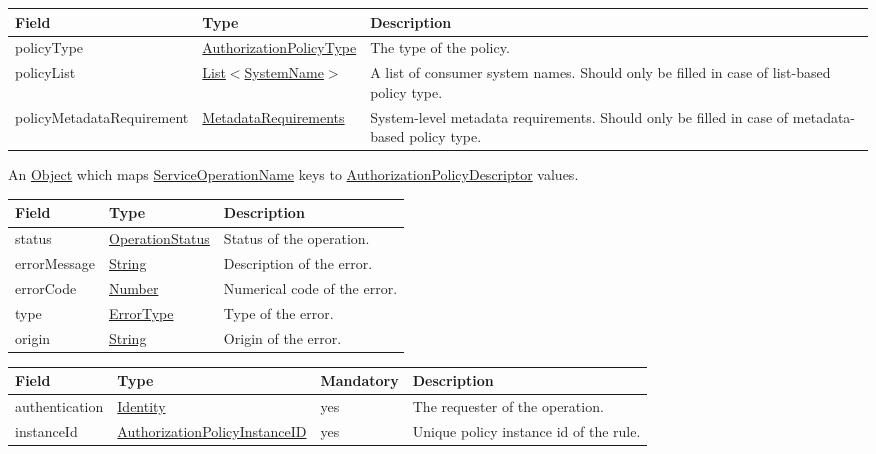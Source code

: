 \documentclass[a4paper]{arrowhead}
\newcommand{\pref}[1]{{\textcolor{ArrowheadGrey}{\hyperref[sec:model:primitives:#1]{#1}}}}
\begin{document}

\begin{table}[ht!]
\begin{tabularx}{\textwidth}{| p{4.3cm} | p{4.1cm} | X |} \hline
\rowcolor{gray!33} Field & Type      & Description \\ \hline
policyType & \pref{AuthorizationPolicyType} & The type of the policy. \\ \hline
policyList & \pref{List}$<$\pref{SystemName}$>$ & A list of consumer system names. Should only be filled in case of list-based policy type. \\ \hline
policyMetadataRequirement & \hyperref[sec:model:MetadataRequirements]{MetadataRequirements} & System-level metadata requirements. Should only be filled in case of metadata-based policy type. \\ \hline 
\end{tabularx}
\end{table}


An \pref{Object} which maps \pref{ServiceOperationName} keys to \hyperref[sec:model:AuthorizationPolicyDescriptor]{AuthorizationPolicyDescriptor} values.


\begin{table}[ht!]
\begin{tabularx}{\textwidth}{| p{4.25cm} | p{3.5cm} | X |} \hline
\rowcolor{gray!33} Field & Type      & Description \\ \hline
status & \pref{OperationStatus} & Status of the operation. \\ \hline
errorMessage & \pref{String} & Description of the error. \\ \hline
errorCode &\pref{Number}  & Numerical code of the error. \\ \hline
type & \pref{ErrorType} & Type of the error. \\ \hline
origin & \pref{String} & Origin of the error. \\ \hline
\end{tabularx}
\end{table}


\begin{table}[ht!]
\begin{tabularx}{\textwidth}{| p{3cm} | p{4.5cm} | p{2cm} | X |} \hline
\rowcolor{gray!33} Field & Type & Mandatory & Description \\ \hline
authentication &\hyperref[sec:model:Identity]{Identity} & yes & The requester of the operation. \\ \hline
instanceId & \pref{AuthorizationPolicyInstanceID} & yes & Unique policy instance id of the rule. \\ \hline
\end{tabularx}
\end{table}
\end{document}
